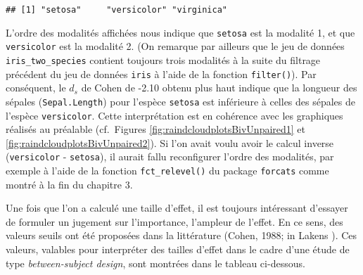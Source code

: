\documentclass[
  french,
]{book}
\newenvironment{Shaded}{\begin{snugshade}}{\end{snugshade}}
\newcommand{\KeywordTok}[1]{\textcolor[rgb]{0.13,0.29,0.53}{\textbf{#1}}}
\newcommand{\NormalTok}[1]{#1}
\newcommand{\OperatorTok}[1]{\textcolor[rgb]{0.81,0.36,0.00}{\textbf{#1}}}
\begin{document}
\begin{Shaded}
\end{Shaded}

\begin{verbatim}
## [1] "setosa"     "versicolor" "virginica"
\end{verbatim}

L'ordre des modalités affichées nous indique que \texttt{setosa} est la modalité 1, et que \texttt{versicolor} est la modalité 2. (On remarque par ailleurs que le jeu de données \texttt{iris\_two\_species} contient toujours trois modalités à la suite du filtrage précédent du jeu de données \texttt{iris} à l'aide de la fonction \texttt{filter()}). Par conséquent, le \(d_{s}\) de Cohen de -2.10 obtenu plus haut indique que la longueur des sépales (\texttt{Sepal.Length}) pour l'espèce \texttt{setosa} est inférieure à celles des sépales de l'espèce \texttt{versicolor}. Cette interprétation est en cohérence avec les graphiques réalisés au préalable (cf.~Figures \ref{fig:raindcloudplotsBivUnpaired1} et \ref{fig:raindcloudplotsBivUnpaired2}). Si l'on avait voulu avoir le calcul inverse (\texttt{versicolor} - \texttt{setosa}), il aurait fallu reconfigurer l'ordre des modalités, par exemple à l'aide de la fonction \texttt{fct\_relevel()} du package \texttt{forcats} comme montré à la fin du chapitre 3.

Une fois que l'on a calculé une taille d'effet, il est toujours intéressant d'essayer de formuler un jugement sur l'importance, l'ampleur de l'effet. En ce sens, des valeurs seuils ont été proposées dans la littérature (Cohen, 1988; in Lakens \autocite*{lakensCalculatingReportingEffect2013}). Ces valeurs, valables pour interpréter des tailles d'effet dans le cadre d'une étude de type \emph{between-subject design}, sont montrées dans le tableau ci-dessous.

\providecommand{\docline}[3]{\noalign{\global\setlength{\arrayrulewidth}{#1}}\arrayrulecolor[HTML]{#2}\cline{#3}}

\setlength{\tabcolsep}{2pt}

\renewcommand*{\arraystretch}{1.5}
\end{document}

